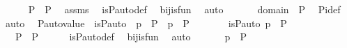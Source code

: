 \begin{isabellebody}
\ \ \isamarkupfalse%
\ {\isachardoublequoteopen}{\isasympi}\ {\isasymin}\ P\ {\isasymrightarrow}\ P{\isachardoublequoteclose}\ \isamarkupfalse%
\ assms\ \isamarkupfalse%
\ is{\isacharunderscore}{\kern0pt}P{\isacharunderscore}{\kern0pt}auto{\isacharunderscore}{\kern0pt}def\ \isamarkupfalse%
\ bij{\isacharunderscore}{\kern0pt}is{\isacharunderscore}{\kern0pt}fun\ \isamarkupfalse%
\ auto\ \isanewline
\ \ \isamarkupfalse%
\ \isamarkupfalse%
\ {\isachardoublequoteopen}domain{\isacharparenleft}{\kern0pt}{\isasympi}{\isacharparenright}{\kern0pt}\ {\isacharequal}{\kern0pt}\ P{\isachardoublequoteclose}\ \isamarkupfalse%
\ Pi{\isacharunderscore}{\kern0pt}def\ \isamarkupfalse%
\ auto\ \isanewline
{}\isamarkupfalse%
%
\endisatagproof
{\isafoldproof}%
%
\isadelimproof
\isanewline
%
\endisadelimproof
\isanewline
{}\isamarkupfalse%
\ P{\isacharunderscore}{\kern0pt}auto{\isacharunderscore}{\kern0pt}value\ {\isacharcolon}{\kern0pt}\ {\isachardoublequoteopen}is{\isacharunderscore}{\kern0pt}P{\isacharunderscore}{\kern0pt}auto{\isacharparenleft}{\kern0pt}{\isasympi}{\isacharparenright}{\kern0pt}\ {\isasymLongrightarrow}\ p\ {\isasymin}\ P\ {\isasymLongrightarrow}\ {\isasympi}{\isacharbackquote}{\kern0pt}p\ {\isasymin}\ P{\isachardoublequoteclose}\ \isanewline
%
\isadelimproof
%
\endisadelimproof
%
\isatagproof
{}\isamarkupfalse%
\ {\isacharminus}{\kern0pt}\ \isanewline
\ \ \isamarkupfalse%
\ {\isachardoublequoteopen}is{\isacharunderscore}{\kern0pt}P{\isacharunderscore}{\kern0pt}auto{\isacharparenleft}{\kern0pt}{\isasympi}{\isacharparenright}{\kern0pt}{\isachardoublequoteclose}\ {\isachardoublequoteopen}p\ {\isasymin}\ P\ {\isachardoublequoteclose}\isanewline
\ \ \isamarkupfalse%
\ \isamarkupfalse%
\ {\isachardoublequoteopen}{\isasympi}\ {\isasymin}\ P\ {\isasymrightarrow}\ P{\isachardoublequoteclose}\isanewline
\ \ \ \ \isamarkupfalse%
\ is{\isacharunderscore}{\kern0pt}P{\isacharunderscore}{\kern0pt}auto{\isacharunderscore}{\kern0pt}def\ \isamarkupfalse%
\ bij{\isacharunderscore}{\kern0pt}is{\isacharunderscore}{\kern0pt}fun\ \isamarkupfalse%
\ auto\ \isanewline
\ \ \isamarkupfalse%
\ \isamarkupfalse%
\ {\isachardoublequoteopen}{\isasympi}{\isacharbackquote}{\kern0pt}p\ {\isasymin}\ P{\isachardoublequoteclose}\ \isamarkupfalse%

\end{isabellebody}
